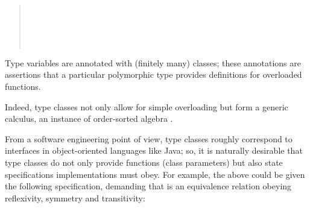 \begin{isabellebody}
\begin{isamarkuptext}
\begin{quote}
  \medskip\noindent{} \\
  \hspace*{2ex}

  \medskip\noindent{} \\
  \hspace*{2ex} \\
  \hspace*{2ex}

  \end{quote}

  \noindent Type variables are annotated with (finitely many) classes;
  these annotations are assertions that a particular polymorphic type
  provides definitions for overloaded functions.

  Indeed, type classes not only allow for simple overloading but form
  a generic calculus, an instance of order-sorted algebra
  \cite{nipkow-sorts93,Nipkow-Prehofer:1993,Wenzel:1997:TPHOL}.

  From a software engineering point of view, type classes roughly
  correspond to interfaces in object-oriented languages like Java; so,
  it is naturally desirable that type classes do not only provide
  functions (class parameters) but also state specifications
  implementations must obey.  For example, the 
  above could be given the following specification, demanding that
   is an equivalence relation obeying reflexivity,
  symmetry and transitivity:


\end{isamarkuptext}
\end{isabellebody}
